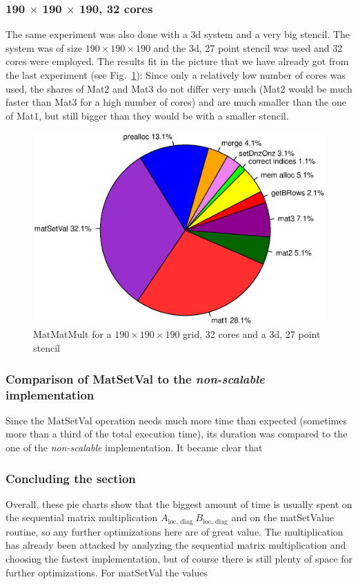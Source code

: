 \subsubsection*{190 $\times$ 190 $\times$ 190, 32 cores}
The same experiment was also done with a 3d system and a very big stencil. The system was of size $190 \times 190 \times 190$ and the 3d, 27 point stencil was used and 32 cores were employed. The results fit in the picture that we have already got from the last experiment (see Fig.~\ref{fig:pie_32_190}): Since only a relatively low number of cores was used, the shares of Mat2 and Mat3 do not differ very much (Mat2 would be much faster than Mat3 for a high number of cores) and are much smaller than the one of Mat1, but still bigger than they would be with a smaller stencil. 

\begin{figure}[tbp]
	\centering
	\includegraphics[width=1\textwidth, trim={0 3.5cm 0 3cm},clip]{32cores_190}
	\caption{MatMatMult for a $190 \times 190 \times 190$ grid, 32 cores and a 3d, 27 point stencil} 
	\label{fig:pie_32_190}
\end{figure}

\subsubsection*{Comparison of MatSetVal to the \textit{non-scalable} implementation}

Since the MatSetVal operation needs much more time than expected (sometimes more than a third of the total execution time), its duration was compared to the one of the \textit{non-scalable} implementation. It became clear that 

\subsubsection*{Concluding the section}
Overall, these pie charts show that the biggest amount of time is usually spent on the sequential matrix multiplication $A_{\textrm{loc, diag~}} B_{\textrm{loc, diag}}$ and on the matSetValue routine, so any further optimizations here are of great value. The multiplication has already been attacked by analyzing the sequential matrix multiplication and choosing the fastest implementation, but of course there is still plenty of space for further optimizations. For matSetVal the values 


